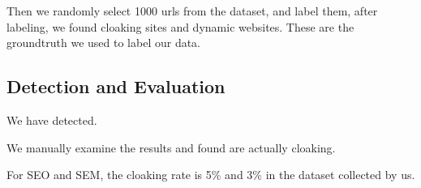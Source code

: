Then we randomly select 1000 urls from the dataset, and label them, after
labeling, we found  cloaking sites and  dynamic websites.
These are the groundtruth we used to label our data.

\subsection{Detection and Evaluation}
We have detected.

We manually examine the results and found  are actually cloaking.

For SEO and SEM, the cloaking rate is 5\% and 3\% in the dataset collected by
us.



